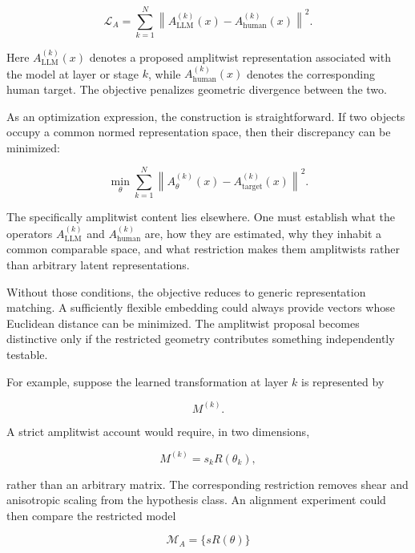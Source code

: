\documentclass[11pt]{article}
\begin{document}
\begin{equation}
\mathcal L_A
=
\sum_{k=1}^{N}
\left\|
A_{\mathrm{LLM}}^{(k)}(x)
-
A_{\mathrm{human}}^{(k)}(x)
\right\|^2.
\end{equation}

Here $A_{\mathrm{LLM}}^{(k)}(x)$ denotes a proposed amplitwist representation associated with the model at layer or stage $k$, while $A_{\mathrm{human}}^{(k)}(x)$ denotes the corresponding human target. The objective penalizes geometric divergence between the two.

As an optimization expression, the construction is straightforward. If two objects occupy a common normed representation space, then their discrepancy can be minimized:

\begin{equation}
\min_\theta
\sum_{k=1}^{N}
\left\|
A_{\theta}^{(k)}(x)
-
A_{\mathrm{target}}^{(k)}(x)
\right\|^2.
\end{equation}

The specifically amplitwist content lies elsewhere. One must establish what the operators $A_{\mathrm{LLM}}^{(k)}$ and $A_{\mathrm{human}}^{(k)}$ are, how they are estimated, why they inhabit a common comparable space, and what restriction makes them amplitwists rather than arbitrary latent representations.

Without those conditions, the objective reduces to generic representation matching. A sufficiently flexible embedding could always provide vectors whose Euclidean distance can be minimized. The amplitwist proposal becomes distinctive only if the restricted geometry contributes something independently testable.

For example, suppose the learned transformation at layer $k$ is represented by

\begin{equation}
M^{(k)}.
\end{equation}

A strict amplitwist account would require, in two dimensions,

\begin{equation}
M^{(k)}
=
s_kR(\theta_k),
\end{equation}

rather than an arbitrary matrix. The corresponding restriction removes shear and anisotropic scaling from the hypothesis class. An alignment experiment could then compare the restricted model

\begin{equation}
\mathcal M_A
=
\{sR(\theta)\}
\end{equation}
\end{document}
